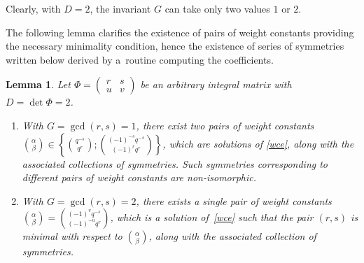 \documentclass[10pt,a4paper]{amsart}
\numberwithin{equation}{section}
\newtheorem{Lemma}[Theorem]{Lemma}
\begin{document}
Clearly, with $D=2$, the invariant $G$ can take only two values $1$ or $2$.

The following lemma clarifies the existence of pairs of weight constants providing the necessary minimality condition, hence the existence of series of symmetries written below derived by a~routine computing the coefficients.

\begin{Lemma}\label{lem_det2}
Let $\Phi=\left(\begin{smallmatrix}r & s\\ u & v\end{smallmatrix}\right)$ be an arbitrary integral matrix with $D=\det\Phi=2$.
\begin{enumerate}\itemsep=0pt
\item[$1.$] With $G=\operatorname{gcd}(r,s)=1$, there exist two pairs of weight constants $\binom{\alpha}{\beta}\!\in\!\left\{\binom{q^{-s}}{q^r};
\binom{(-1)^{-s}q^{-s}}{(-1)^rq^r}\right\}$, which are solutions of \eqref{wce}, along with the associated collections of symmetries. Such symmetries corresponding to different pairs of weight constants are non-isomorphic.
\item[$2.$]With $G=\operatorname{gcd}(r,s)=2$, there exists a single pair of weight constants $\binom{\alpha}{\beta}=\binom{(-1)^vq^{-s}}{(-1)^{-u}q^r}$, which is a solution of~\eqref{wce} such that the pair $(r,s)$ is minimal with respect to $\binom{\alpha}{\beta}$, along with the associated collection of symmetries.
\end{enumerate}
\end{Lemma}
\end{document}
